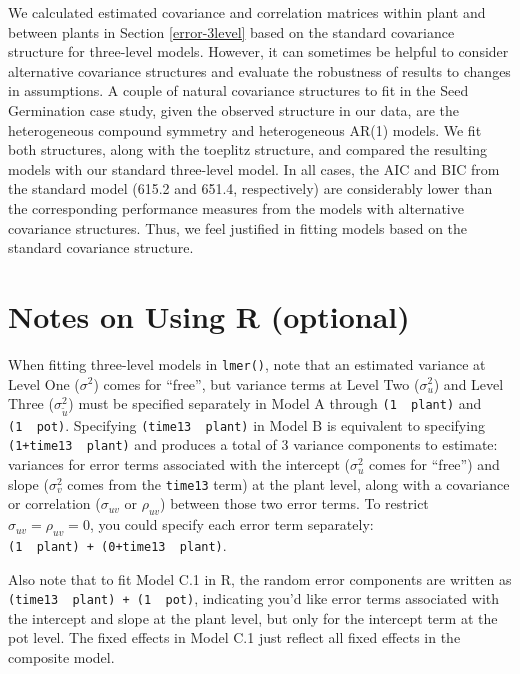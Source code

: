 \documentclass[
]{krantz}
\begin{document}
We calculated estimated covariance and correlation matrices within plant and between plants in Section \ref{error-3level} based on the standard covariance structure for three-level models. However, it can sometimes be helpful to consider alternative covariance structures and evaluate the robustness of results to changes in assumptions. A couple of natural covariance structures to fit in the Seed Germination case study, given the observed structure in our data, are the heterogeneous compound symmetry and heterogeneous AR(1) models. We fit both structures, along with the toeplitz structure, and compared the resulting models with our standard three-level model. In all cases, the AIC and BIC from the standard model (615.2 and 651.4, respectively) are considerably lower than the corresponding performance measures from the models with alternative covariance structures. Thus, we feel justified in fitting models based on the standard covariance structure.

\section{Notes on Using R (optional)}\label{usingR3}

When fitting three-level models in \texttt{lmer()}, note that an estimated variance at Level One (\(\sigma^{2}\)) comes for ``free'', but variance terms at Level Two (\(\sigma_{u}^{2}\)) and Level Three (\(\sigma_{\tilde{u}}^{2}\)) must be specified separately in Model A through \texttt{(1\ \textbar{}\ plant)} and \texttt{(1\ \textbar{}\ pot)}. Specifying \texttt{(time13\ \textbar{}\ plant)} in Model B is equivalent to specifying \texttt{(1+time13\ \textbar{}\ plant)} and produces a total of 3 variance components to estimate: variances for error terms associated with the intercept (\(\sigma_{u}^{2}\) comes for ``free'') and slope (\(\sigma_{v}^{2}\) comes from the \texttt{time13} term) at the plant level, along with a covariance or correlation (\(\sigma_{uv}\) or \(\rho_{uv}\)) between those two error terms. To restrict \(\sigma_{uv} = \rho_{uv} = 0\), you could specify each error term separately: \texttt{(1\ \textbar{}\ plant)\ +\ (0+time13\ \textbar{}\ plant)}.

Also note that to fit Model C.1 in R, the random error components are written as \texttt{(time13\ \textbar{}\ plant)\ +\ (1\ \textbar{}\ pot)}, indicating you'd like error terms associated with the intercept and slope at the plant level, but only for the intercept term at the pot level. The fixed effects in Model C.1 just reflect all fixed effects in the composite model.
\end{document}
